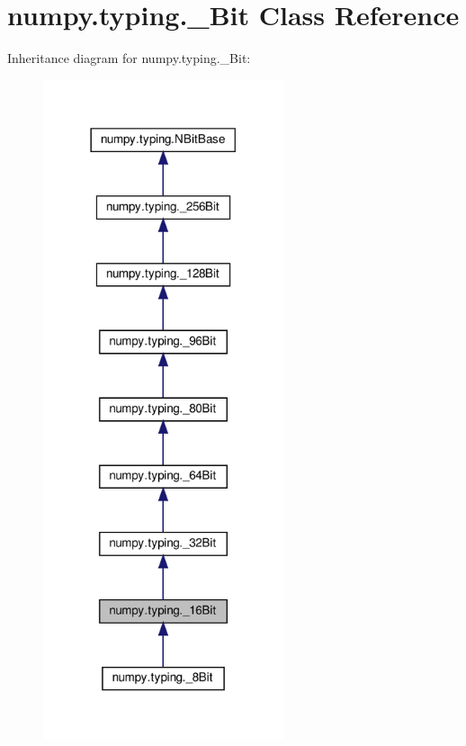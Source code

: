 \hypertarget{classnumpy_1_1typing_1_1__16Bit}{}\section{numpy.\+typing.\+\_\+Bit Class Reference}
\label{classnumpy_1_1typing_1_1__16Bit}


Inheritance diagram for numpy.\+typing.\+\_\+Bit\+:
\nopagebreak
\begin{figure}[H]
\begin{center}
\leavevmode
\includegraphics[width=200pt]{classnumpy_1_1typing_1_1__16Bit__inherit__graph}
\end{center}
\end{figure}


